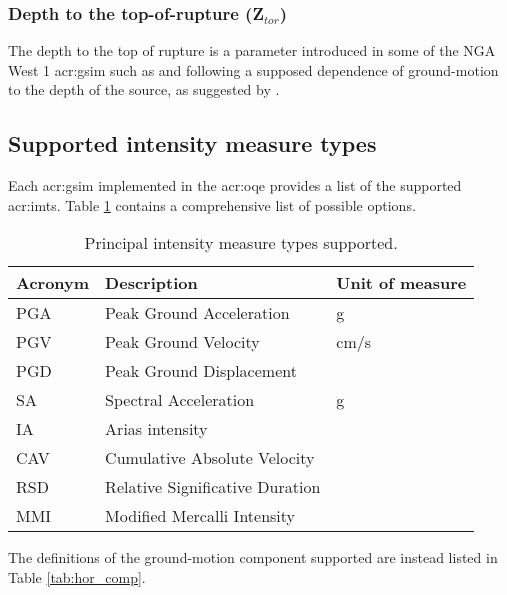\subsubsection{Depth to the top-of-rupture (Z$_{tor}$)}
The depth to the top of rupture is a parameter introduced in some of the NGA
West 1 \gls{acr:gsim} such as \textcite{chiou2008} and \textcite{abrahamson2008}
following a supposed dependence of ground-motion to the depth of the source,
as suggested by \textcite{somerville2006a}.
%
\subsection{Supported intensity measure types}
Each \gls{acr:gsim} implemented in the \gls{acr:oqe} provides a list of the 
supported \glspl{acr:imt}. Table \ref{tab:imts} contains a comprehensive list 
of possible options.
\begin{table}[!h]
\centering
\caption{Principal intensity measure types supported.}
\begin{tabular}{|p{3cm}p{5cm}p{3cm}|}
\hline
\rowcolor{anti-flashwhite}
\bf{Acronym} & \bf{Description} & \bf{Unit of measure} \\
\hline 
PGA & Peak Ground Acceleration & g \\
PGV & Peak Ground Velocity     & cm/s \\
PGD & Peak Ground Displacement & \\
SA  & Spectral Acceleration    & g \\
IA  & Arias intensity &  \\
CAV & Cumulative Absolute Velocity &  \\
RSD & Relative Significative Duration \parencite{trifunac1975}&  \\
MMI & Modified Mercalli Intensity &  \\
\hline
\end{tabular}
\label{tab:imts}
\end{table}
The definitions of the ground-motion component supported are instead listed in
Table \ref{tab:hor_comp}. 

